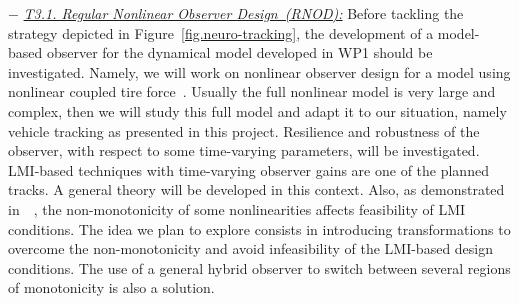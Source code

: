 \documentclass[a4paper,11pt]{article}
\begin{document}
\begin{itemize}[leftmargin=.2in,noitemsep,nolistsep]

%
\subitem$-$ \underline{\it T3.1. Regular Nonlinear Observer Design~(RNOD):} Before tackling the strategy depicted in Figure~\ref{fig.neuro-tracking}, the development of a model-based observer for the dynamical model developed in WP1 should be investigated. Namely, we will work on nonlinear observer design for a model using nonlinear coupled tire force~\cite{RajamaniBOOK}. Usually the full nonlinear model is very large and complex, then we will study this full model and adapt it to our situation, namely vehicle tracking as presented in this project.
Resilience and robustness of the observer, with respect to some time-varying parameters, will be investigated.
LMI-based techniques with time-varying observer gains are one of the planned tracks. A general theory will be developed in this context. Also, as demonstrated in~~\cite{RAJAMANI2020108814}, the non-monotonicity of some nonlinearities affects feasibility of LMI conditions. The idea we plan to explore consists in introducing transformations to overcome the non-monotonicity and avoid infeasibility of the LMI-based design conditions. The use of a general hybrid observer to switch between several regions of monotonicity is also a solution. %

\end{itemize}
\end{document}
